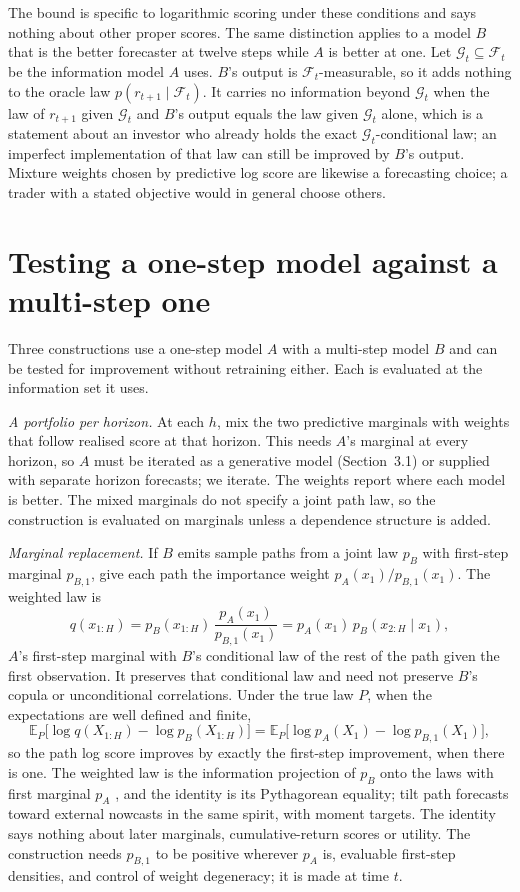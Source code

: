 \documentclass[11pt]{article}
\newcommand{\E}{\mathbb{E}}
\newcommand{\F}{\mathcal{F}}
\begin{document}
The bound is specific to logarithmic scoring under these conditions and says nothing about other proper scores. The same distinction applies to a model $B$ that is the better forecaster at twelve steps while $A$ is better at one. Let $\mathcal{G}_t \subseteq \F_t$ be the information model $A$ uses. $B$'s output is $\F_t$-measurable, so it adds nothing to the oracle law $p(r_{t+1} \mid \F_t)$. It carries no information beyond $\mathcal{G}_t$ when the law of $r_{t+1}$ given $\mathcal{G}_t$ and $B$'s output equals the law given $\mathcal{G}_t$ alone, which is a statement about an investor who already holds the exact $\mathcal{G}_t$-conditional law; an imperfect implementation of that law can still be improved by $B$'s output. Mixture weights chosen by predictive log score are likewise a forecasting choice; a trader with a stated objective would in general choose others.

\section{Testing a one-step model against a multi-step one}

Three constructions use a one-step model $A$ with a multi-step model $B$ and can be tested for improvement without retraining either. Each is evaluated at the information set it uses.

\emph{A portfolio per horizon.} At each $h$, mix the two predictive marginals with weights that follow realised score at that horizon. This needs $A$'s marginal at every horizon, so $A$ must be iterated as a generative model (Section~3.1) or supplied with separate horizon forecasts; we iterate. The weights report where each model is better. The mixed marginals do not specify a joint path law, so the construction is evaluated on marginals unless a dependence structure is added.

\emph{Marginal replacement.} If $B$ emits sample paths from a joint law $p_B$ with first-step marginal $p_{B,1}$, give each path the importance weight $p_A(x_1)/p_{B,1}(x_1)$. The weighted law is
\[
q(x_{1:H}) = p_B(x_{1:H})\,\frac{p_A(x_1)}{p_{B,1}(x_1)} = p_A(x_1)\, p_B(x_{2:H} \mid x_1),
\]
$A$'s first-step marginal with $B$'s conditional law of the rest of the path given the first observation. It preserves that conditional law and need not preserve $B$'s copula or unconditional correlations. Under the true law $P$, when the expectations are well defined and finite,
\[
\E_P\big[\log q(X_{1:H}) - \log p_B(X_{1:H})\big] = \E_P\big[\log p_A(X_1) - \log p_{B,1}(X_1)\big],
\]
so the path log score improves by exactly the first-step improvement, when there is one. The weighted law is the information projection of $p_B$ onto the laws with first marginal $p_A$ \citep{csiszar1975}, and the identity is its Pythagorean equality; \citet{kruger2017} tilt path forecasts toward external nowcasts in the same spirit, with moment targets. The identity says nothing about later marginals, cumulative-return scores or utility. The construction needs $p_{B,1}$ to be positive wherever $p_A$ is, evaluable first-step densities, and control of weight degeneracy; it is made at time $t$.
\end{document}
